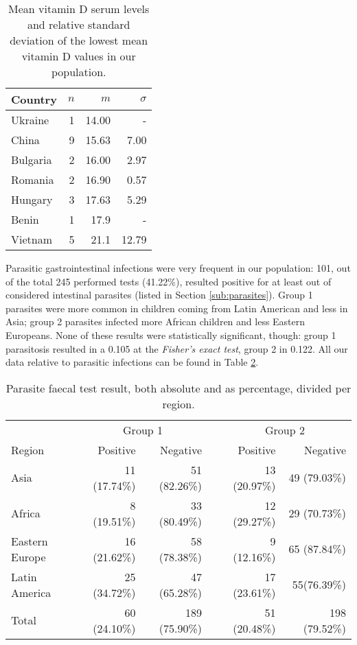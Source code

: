 \begin{table}[H]
   \centering
   \begin{tabular}{l r r r}
      Country\footnotemark[3] & $n$ & $m$ & $\sigma$\\
      \hline
      Ukraine & 1 & 14.00 & -\\
      China & 9 & 15.63 & 7.00\\
      Bulgaria & 2 & 16.00 & 2.97\\
      Romania & 2 & 16.90 & 0.57\\
      Hungary & 3 & 17.63 & 5.29\\
      Benin & 1 & 17.9 & -\\
      Vietnam & 5 & 21.1 & 12.79\\
   \end{tabular}
   \caption{Mean vitamin D serum levels and relative standard deviation of the lowest mean vitamin D values in our population.}
    \label{tab:vitamindpercountry}
\end{table}


Parasitic gastrointestinal infections were very frequent in our population: 101, out of the total 245 performed tests (41.22\%), resulted positive for at least out of considered intestinal parasites (listed in Section \ref{sub:parasites}). Group 1 parasites were more common in children coming from Latin American and less in Asia; group 2 parasites infected more African children and less Eastern Europeans. None of these results were statistically significant, though: group 1 parasitosis resulted in a 0.105 at the \textit{Fisher's exact test}, group 2 in 0.122. All our data relative to parasitic infections can be found in Table \ref{tab:parasitesperregion}.

\begin{table}[H]
   \centering
   \begin{tabular}{l r r c r r}
       & \multicolumn{2}{c}{Group 1} & & \multicolumn{2}{c}{Group 2}\\
       \cline{2-3} \cline{5-6}
      Region\footnotemark[4] & Positive & Negative & & Positive & Negative\\
      \hline
      Asia & 11 (17.74\%) & 51 (82.26\%) & & 13 (20.97\%) & 49 (79.03\%)\\
      Africa & 8 (19.51\%) & 33 (80.49\%) & & 12 (29.27\%) & 29 (70.73\%)\\
      Eastern Europe & 16 (21.62\%) & 58 (78.38\%) & & 9 (12.16\%) & 65 (87.84\%)\\
      Latin America & 25 (34.72\%) & 47 (65.28\%) & & 17 (23.61\%) & 55(76.39\%)\\
      \hline
      Total & 60 (24.10\%) & 189 (75.90\%) & & 51 (20.48\%) & 198 (79.52\%)\\
   \end{tabular}
   \caption{Parasite faecal test result, both absolute and as percentage, divided per region.}
    \label{tab:parasitesperregion}
\end{table}

